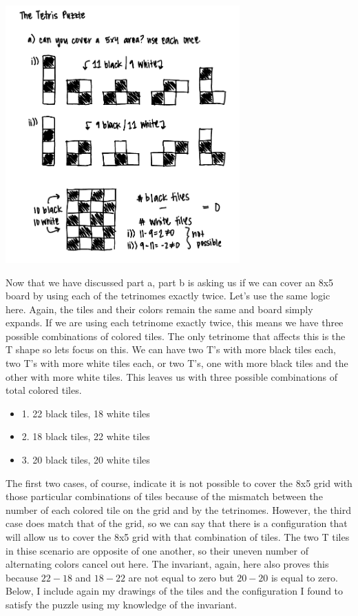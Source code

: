 \documentclass{article}
\theoremstyle{theorem}
\theoremstyle{definition}
\theoremstyle{remark}
\begin{document}
  \begin{center}
    \includegraphics[width=9cm]{tetrisA.png}
  \end{center}


Now that we have discussed part a, part b is asking us if we can cover an 8x5 board by using each of the tetrinomes exactly twice. Let's use the same logic here. Again, the tiles and their colors remain the same and board simply expands. 
If we are using each tetrinome exactly twice, this means we have three possible combinations of colored tiles. The only tetrinome that affects this is the T shape so lets focus on this. We can have two T's with more black tiles each, two T's with more white tiles each, or 
two T's, one with more black tiles and the other with more white tiles. This leaves us with three possible combinations of total colored tiles. \\

\begin{itemize}
  \item[\ding{99}] 1. 22 black tiles, 18 white tiles 
  \item[\ding{99}] 2. 18 black tiles, 22 white tiles 
  \item[\ding{99}] 3. 20 black tiles, 20 white tiles
\end{itemize}

The first two cases, of course, indicate it is not possible to cover the 8x5 grid with those particular combinations of tiles because of the mismatch between the number of each colored tile on the grid and by the tetrinomes. However, the third case does match that of the grid, so we can say that there is a configuration that will allow us to cover the 8x5 grid with that 
combination of tiles. The two T tiles in thise scenario are opposite of one another, so their uneven number of alternating colors cancel out here. The invariant, again, here also proves this because $22-18$ and $18-22$ are not equal to zero but $20-20$ is equal to zero. Below, I include 
again my drawings of the tiles and the configuration I found to satisfy the puzzle using my knowledge of the invariant. \\
\end{document}
